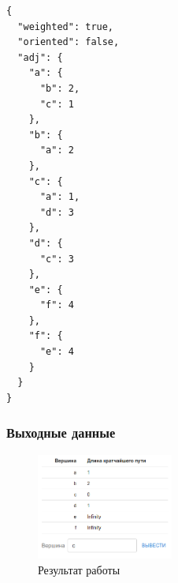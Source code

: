 \begin{verbatim}
{
  "weighted": true,
  "oriented": false,
  "adj": {
    "a": {
      "b": 2,
      "c": 1
    },
    "b": {
      "a": 2
    },
    "c": {
      "a": 1,
      "d": 3
    },
    "d": {
      "c": 3
    },
    "e": {
      "f": 4
    },
    "f": {
      "e": 4
    }
  }
}
\end{verbatim}

\subsubsection{Выходные данные}
\begin{figure}[H]
  \centering\includegraphics[width=0.4\textwidth]{figs/task-6/res-6.png}
  \caption{Результат работы}
\end{figure}